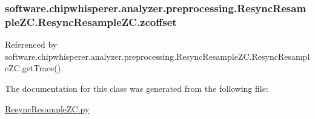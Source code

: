 \subsubsection[{zcoffset}]{\setlength{\rightskip}{0pt plus 5cm}software.\+chipwhisperer.\+analyzer.\+preprocessing.\+Resync\+Resample\+Z\+C.\+Resync\+Resample\+Z\+C.\+zcoffset}\label{classsoftware_1_1chipwhisperer_1_1analyzer_1_1preprocessing_1_1ResyncResampleZC_1_1ResyncResampleZC_aafac1084581095b34dfb9b7ac44be9e7}


Referenced by software.\+chipwhisperer.\+analyzer.\+preprocessing.\+Resync\+Resample\+Z\+C.\+Resync\+Resample\+Z\+C.\+get\+Trace().



The documentation for this class was generated from the following file\+:\begin{DoxyCompactItemize}
\item 
\hyperlink{ResyncResampleZC_8py}{Resync\+Resample\+Z\+C.\+py}\end{DoxyCompactItemize}
